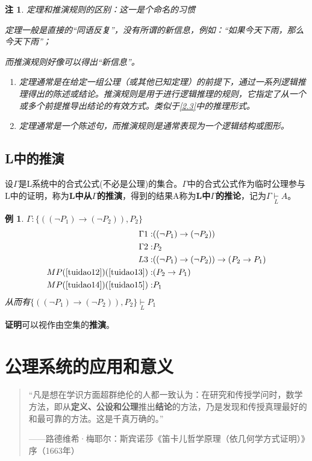 \documentclass[12pt,onecolumn,a4paper]{book}
\newtheorem*{example}{例}
\newtheorem*{note}{注}
\numberwithin{table}{subsection}
\numberwithin{equation}{subsection}
\begin{document}
\begin{note}
    定理和推演规则的区别：这一是个命名的习惯

    定理一般是直接的“同语反复”，没有所谓的新信息，例如：“如果今天下雨，那么今天下雨”；
    
    而推演规则好像可以得出“新信息”。

    \begin{enumerate}[itemsep=0pt,parsep=0pt]
        \item 定理通常是在给定一组公理（或其他已知定理）的前提下，通过一系列逻辑推理得出的陈述或结论。推演规则是用于进行逻辑推理的规则，它指定了从一个或多个前提推导出结论的有效方式。类似于\ref{2.3}中的推理形式。
        \item 定理通常是一个陈述句，而推演规则是通常表现为一个逻辑结构或图形。
    \end{enumerate}
\end{note}

\subsection{L中的推演}

设$\Gamma$是L系统中的合式公式(不必是公理)的集合。$\Gamma$中的合式公式作为临时公理参与L中的证明，称为\textbf{L中从$\Gamma$的推演}，得到的结果A称为\textbf{L中$\Gamma$的推论}，记为$\Gamma \underset{L}{\vdash} A$。

\begin{example}$\Gamma :\{((\neg P_1)\rightarrow(\neg P_2)),P_2\}$
    \begin{align}
        \Gamma 1: &((\neg P_1)\rightarrow(\neg P_2)) \label{tuidao12}\\
        \Gamma 2: & P_2 \label{tuidao14}\\
        L3: &((\neg P_1)\rightarrow(\neg P_2)) \rightarrow (P_2\rightarrow P_1)\label{tuidao13}\\
        MP(\ref{tuidao12})(\ref{tuidao13}):&(P_2 \rightarrow P_1)\label{tuidao15}\\
        MP(\ref{tuidao14})(\ref{tuidao15}):&P_1
    \end{align}
    从而有$\{((\neg P_1)\rightarrow(\neg P_2)),P_2\}\underset{L}{\vdash} P_1$
\end{example}
\textbf{证明}可以视作由空集的\textbf{推演}。

\section{公理系统的应用和意义}
\begin{quotation}
    “凡是想在学识方面超群绝伦的人都一致认为：在研究和传授学问时，数学方法，即从\textbf{定义、公设和公理}推出\textbf{结论}的方法，乃是发现和传授真理最好的和最可靠的方法。这是千真万确的。”
    
    ——路德维希·梅耶尔：斯宾诺莎《笛卡儿哲学原理（依几何学方式证明）》序（1663年）
\end{quotation}
\end{document}
